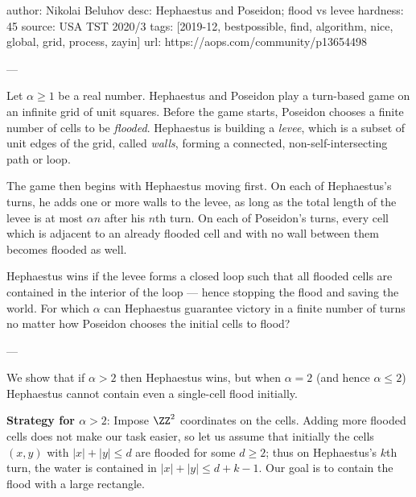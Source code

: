 author: Nikolai Beluhov
desc: Hephaestus and Poseidon; flood vs levee
hardness: 45
source: USA TST 2020/3
tags: [2019-12, bestpossible, find, algorithm, nice, global, grid, process, zayin]
url: https://aops.com/community/p13654498

---

Let $\alpha \ge 1$ be a real number.
Hephaestus and Poseidon play a turn-based game
on an infinite grid of unit squares.
Before the game starts, Poseidon chooses a finite
number of cells to be \emph{flooded}.
Hephaestus is building a \emph{levee},
which is a subset of unit edges of the grid, called \emph{walls},
forming a connected, non-self-intersecting path or loop.

The game then begins with Hephaestus moving first.
On each of Hephaestus's turns, he adds one or more walls
to the levee, as long as the total length of the levee
is at most $\alpha n$ after his $n$th turn.
On each of Poseidon's turns,
every cell which is adjacent to an already flooded cell
and with no wall between them becomes flooded as well.

Hephaestus wins if the levee forms a closed loop
such that all flooded cells are
contained in the interior of the loop ---
hence stopping the flood and saving the world.
For which $\alpha$ can Hephaestus guarantee victory
in a finite number of turns
no matter how Poseidon chooses the initial cells to flood?

---

We show that if $\alpha > 2$
then Hephaestus wins,
but when $\alpha = 2$ (and hence $\alpha \le 2$)
Hephaestus cannot contain even a single-cell flood initially.

\bigskip

\textbf{Strategy for $\alpha > 2$}:
Impose $\ZZ^2$ coordinates on the cells.
Adding more flooded cells does not make our task easier,
so let us assume that initially
the cells $(x,y)$ with $|x|+|y| \le d$ are flooded
for some $d \ge 2$;
thus on Hephaestus's $k$th turn,
the water is contained in $|x|+|y| \le d+k-1$.
Our goal is to contain the flood with a large rectangle.


